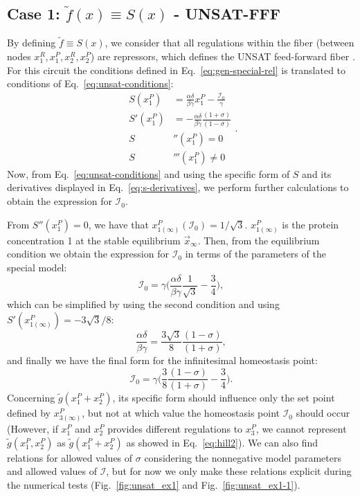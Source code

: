 \subsection{Case 1: $\tilde{f}(x) \equiv S(x)$ - UNSAT-FFF}

By defining $\tilde{f} \equiv S(x)$, we consider that all regulations within the fiber 
(between nodes $x_1^R, x_1^P, x_2^R, x_2^P$) are repressors, which defines the 
UNSAT feed-forward fiber \cite{transistor2019}. For this circuit the conditions 
defined in Eq.~\ref{eq:gen-special-rel} is translated to conditions of
Eq.~\ref{eq:unsat-conditions}: 
\begin{equation} \label{eq:unsat-conditions}
    \begin{aligned}
        S(x_1^P) &= \frac{\alpha \delta}{\beta \gamma}x_1^P - \frac{\mathcal{I}_0}{\gamma} \\
        S'(x_1^P) &= - \frac{\alpha\delta}{\beta\gamma}\frac{(1+\sigma)}{(1-\sigma)} \\
        S&''(x_1^P) = 0\\
        S&'''(x_1^P) \neq 0
    \end{aligned}.
\end{equation}
Now, from Eq.~\ref{eq:unsat-conditions} and using the specific form of $S$ and its 
derivatives displayed in Eq.~\ref{eq:s-derivatives}, we perform further calculations to 
obtain the expression for $\mathcal{I}_0$. 

From $S''(x_1^P) = 0$, we have that $x_{1(\infty)}^P(\mathcal{I}_0) = 1/\sqrt{3}$. $x_{1(\infty)}^P$ is
the protein concentration 1 at the stable equilibrium $\vec{x}_{\infty}$. Then,
from the equilibrium condition we obtain the expression for $\mathcal{I}_0$ in terms of the
parameters of the special model:
\begin{equation} \label{eq:Io-param-unsat}
    \mathcal{I}_0 = \gamma\Bigg(\frac{\alpha \delta}{\beta \gamma}\frac{1}{\sqrt{3}} - \frac{3}{4}\Bigg),
\end{equation} 
which can be simplified by using the second condition and using $S'(x_{1(\infty)}^P) = -3\sqrt{3}/8$:
\begin{equation}
    \frac{\alpha \delta}{\beta \gamma} = \frac{3\sqrt{3}}{8}\frac{(1-\sigma)}{(1+\sigma)},
\end{equation}
and finally we have the final form for the infinitesimal homeostasis point:
\begin{equation} \label{eq:Io-sigma-unsat}
    \mathcal{I}_0 = \gamma\Bigg(\frac{3}{8}\frac{(1-\sigma)}{(1+\sigma)} - \frac{3}{4}\Bigg).
\end{equation}
Concerning $\tilde{g}(x_1^P + x_2^P)$, its specific form should influence only the set point 
defined by $x_{3(\infty)}^P$, but not at which value the homeostasis point $\mathcal{I}_0$  should occur
(However, if $x_1^P$ and $x_2^P$ provides different regulations to $x_3^P$, we cannot represent 
$\tilde{g}(x_1^P, x_2^P)$ as $\tilde{g}(x_1^P + x_2^P)$ as showed in Eq.~\ref{eq:hill2}). We can 
also find relations for allowed values of $\sigma$ considering the nonnegative model parameters 
and allowed values of $\mathcal{I}$, but for now we only make these relations explicit during 
the numerical tests (Fig.~\ref{fig:unsat_ex1} and Fig.~\ref{fig:unsat_ex1-1}).

